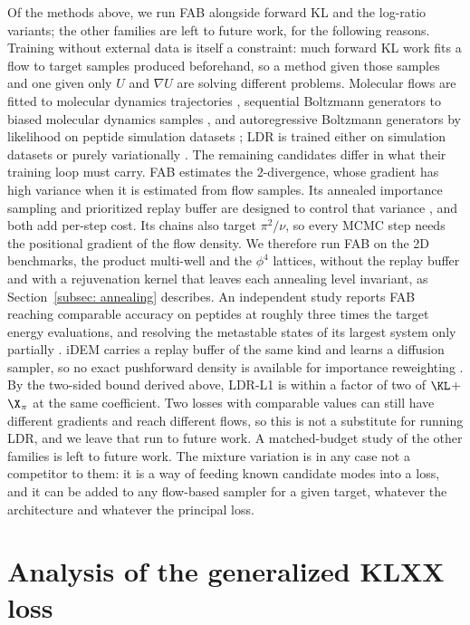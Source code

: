 \documentclass{article}
\begin{document}
Of the methods above, we run FAB alongside forward KL and the log-ratio variants; the other families are left to future work, for the following reasons. Training without external data is itself a constraint: much forward KL work fits a flow to target samples produced beforehand, so a method given those samples and one given only $U$ and $\nabla U$ are solving different problems. Molecular flows are fitted to molecular dynamics trajectories \citep{klein2023equivariant,klein2024transferable}, sequential Boltzmann generators to biased molecular dynamics samples \citep{tan2025sequential}, and autoregressive Boltzmann generators by likelihood on peptide simulation datasets \citep{rehman2026autoregressive}; LDR is trained either on simulation datasets or purely variationally \citep{schopmans2026ldr}. The remaining candidates differ in what their training loop must carry. FAB estimates the $2$-divergence, whose gradient has high variance when it is estimated from flow samples. Its annealed importance sampling and prioritized replay buffer are designed to control that variance \citep{midgley2022flow}, and both add per-step cost. Its chains also target $\pi^2/\nu$, so every MCMC step needs the positional gradient of the flow density. We therefore run FAB on the 2D benchmarks, the product multi-well and the $\phi^4$ lattices, without the replay buffer and with a rejuvenation kernel that leaves each annealing level invariant, as Section~\ref{subsec: annealing} describes. An independent study reports FAB reaching comparable accuracy on peptides at roughly three times the target energy evaluations, and resolving the metastable states of its largest system only partially \citep{schopmans2025temperature}. iDEM carries a replay buffer of the same kind and learns a diffusion sampler, so no exact pushforward density is available for importance reweighting \citep{akhound2024iterated}. By the two-sided bound derived above, LDR-L1 is within a factor of two of $\KL$+$\X_\pi$ at the same coefficient. Two losses with comparable values can still have different gradients and reach different flows, so this is not a substitute for running LDR, and we leave that run to future work. A matched-budget study of the other families is left to future work. The mixture variation is in any case not a competitor to them: it is a way of feeding known candidate modes into a loss, and it can be added to any flow-based sampler for a given target, whatever the architecture and whatever the principal loss.

\section{Analysis of the generalized KLXX loss}
\label{sec: FR}
\end{document}
